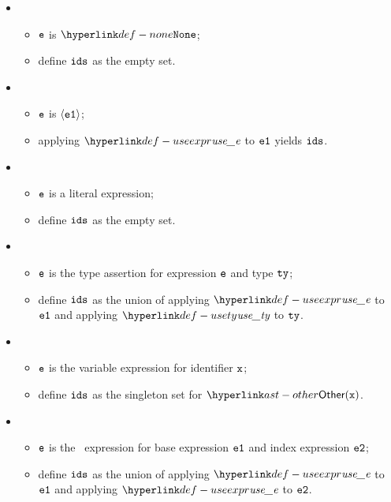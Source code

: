 \ProseParagraph
\OneApplies
\begin{itemize}
  \item {}
  \begin{itemize}
    \item $\texttt{e}$ is $\None$;
    \item define $\texttt{ids}$ as the empty set.
  \end{itemize}

  \item {}
  \begin{itemize}
    \item $\texttt{e}$ is $\langle\texttt{e1}\rangle$;
    \item applying $\useexpr$ to $\texttt{e1}$ yields $\texttt{ids}$.
  \end{itemize}

  \item {}
  \begin{itemize}
    \item $\texttt{e}$ is a literal expression;
    \item define $\texttt{ids}$ as the empty set.
  \end{itemize}

  \item {}
  \begin{itemize}
    \item $\texttt{e}$ is the type assertion for expression $\texttt{e}$ and type $\texttt{ty}$;
    \item define $\texttt{ids}$ as the union of applying $\useexpr$ to $\texttt{e1}$ and applying $\usety$ to $\texttt{ty}$.
  \end{itemize}

  \item {}
  \begin{itemize}
    \item $\texttt{e}$ is the variable expression for identifier $\texttt{x}$;
    \item define $\texttt{ids}$ as the singleton set for $\Other(\vx)$.
  \end{itemize}

  \item {}
  \begin{itemize}
    \item $\texttt{e}$ is the \arrayaccess\ expression for base expression $\texttt{e1}$ and index expression $\texttt{e2}$;
    \item define $\texttt{ids}$ as the union of applying $\useexpr$ to $\texttt{e1}$ and applying $\useexpr$ to $\texttt{e2}$.
  \end{itemize}


\end{itemize}
